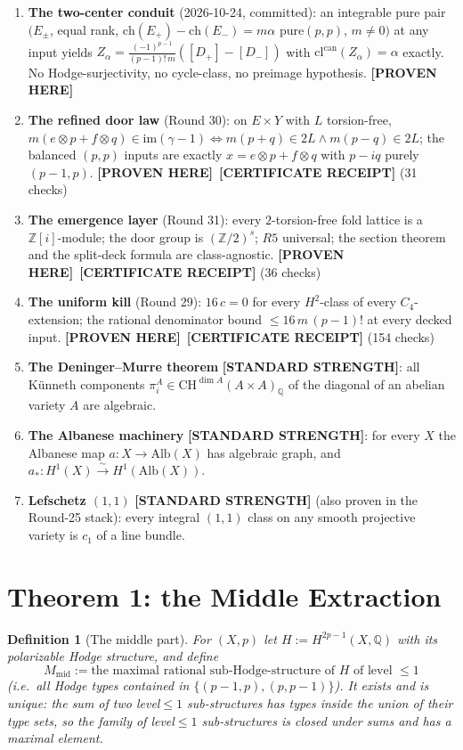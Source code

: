 \documentclass[11pt]{article}
\newtheorem{definition}[theorem]{Definition}
\newcommand{\PROVEN}{\textbf{[PROVEN HERE]}}
\newcommand{\STANDARD}{\textbf{[STANDARD STRENGTH]}}
\newcommand{\CERT}{\textbf{[CERTIFICATE RECEIPT]}}
\newcommand{\Z}{\mathbb{Z}}
\newcommand{\Q}{\mathbb{Q}}
\newcommand{\CH}{\mathrm{CH}}
\newcommand{\im}{\mathrm{im}}
\begin{document}
\begin{enumerate}[label=(B\arabic*)]
\item \textbf{The two-center conduit} (2026-10-24, committed): an integrable
pure pair $(E_\pm$, equal rank, $\mathrm{ch}(E_+)-\mathrm{ch}(E_-)=m\alpha$
pure$(p,p)$, $m\ne0)$ at any input yields
$Z_\alpha=\frac{(-1)^{p-1}}{(p-1)!\,m}([D_+]-[D_-])$ with
$\mathrm{cl}^{\mathrm{can}}(Z_\alpha)=\alpha$ exactly. No
Hodge-surjectivity, no cycle-class, no preimage hypothesis. \PROVEN{}
\item \textbf{The refined door law} (Round 30): on $E\times Y$ with $L$
torsion-free,
$m(e\otimes p+f\otimes q)\in\im(\gamma-1)\iff m(p+q)\in 2L\wedge m(p-q)\in2L$;
the balanced $(p,p)$ inputs are exactly $x=e\otimes p+f\otimes q$ with $p-iq$
purely $(p-1,p)$. \PROVEN{}\ \CERT{} (31 checks)
\item \textbf{The emergence layer} (Round 31): every $2$-torsion-free fold
lattice is a $\Z[i]$-module; the door group is $(\Z/2)^s$; $R5$ universal;
the section theorem and the split-deck formula are class-agnostic.
\PROVEN{}\ \CERT{} (36 checks)
\item \textbf{The uniform kill} (Round 29): $16\,c=0$ for every
$H^2$-class of every $C_4$-extension; the rational denominator bound
$\le 16\,m\,(p-1)!$ at every decked input. \PROVEN{}\ \CERT{} (154 checks)
\item \textbf{The Deninger--Murre theorem} \STANDARD{}: all K\"unneth
components $\pi_i^A\in\CH^{\dim A}(A\times A)_\Q$ of the diagonal of an
abelian variety $A$ are algebraic.
\item \textbf{The Albanese machinery} \STANDARD{}: for every $X$ the Albanese
map $a\colon X\to \mathrm{Alb}(X)$ has algebraic graph, and
$a_*\colon H^1(X)\xrightarrow{\sim}H^1(\mathrm{Alb}(X))$.
\item \textbf{Lefschetz $(1,1)$} \STANDARD{} (also proven in the Round-25 stack):
every integral $(1,1)$ class on any smooth projective variety is $c_1$ of a
line bundle.
\end{enumerate}

\section{Theorem 1: the Middle Extraction}

\begin{definition}[The middle part]
For $(X,p)$ let $H:=H^{2p-1}(X,\Q)$ with its polarizable Hodge structure, and
define
\[
M_{\mathrm{mid}}:=\text{the maximal rational sub-Hodge-structure of }H
\text{ of level }\le 1
\]
(i.e.\ all Hodge types contained in $\{(p-1,p),(p,p-1)\}$). It exists and is
unique: the sum of two level${}\le{}1$ sub-structures has types inside the union
of their type sets, so the family of level${}\le{}1$ sub-structures is closed
under sums and has a maximal element.
\end{definition}
\end{document}
